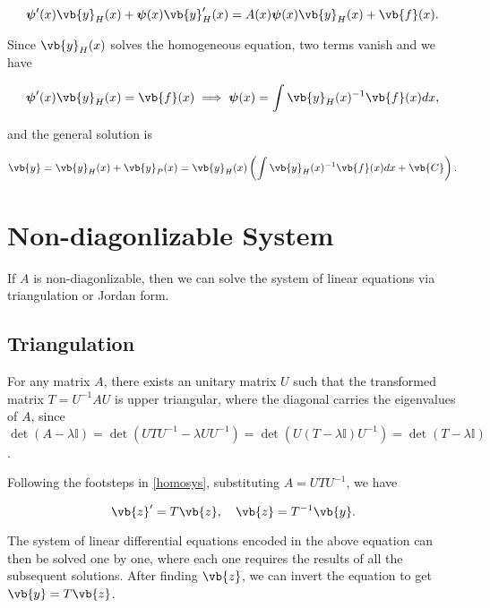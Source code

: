 \documentclass[english,a4paper,12pt]{report}
\begin{document}
\begin{equation}
    \boldsymbol{\psi }'(x)\vb{y} _{H}(x) + \boldsymbol{\psi }(x) \vb{y} _{H}'(x) = A(x) \boldsymbol{\psi }(x) \vb{y} _{H}(x) + \vb{f} (x).
\end{equation}

Since \(\vb{y} _{H}(x)  \) solves the homogeneous equation, two terms vanish and we have

\begin{equation}
    \boldsymbol{\psi }'(x)\vb{y} _{H}(x) = \vb{f} (x) \implies  \boldsymbol{\psi }(x) = \int \vb{y} _{H} (x)^{-1} \vb{f} (x) dx,
\end{equation}

and the general solution is 

\begin{equation}
    \vb{y} = \vb{y} _{H}(x) + \vb{y} _{P}(x) = \vb{y} _{H}(x) \left( \int \vb{y} _{H} (x)^{-1} \vb{f} (x) dx + \vb{C}  \right).
\end{equation}

\section{Non-diagonlizable System}

If \(A\) is non-diagonlizable, then we can solve the system of linear equations via triangulation or Jordan form.

\subsection{Triangulation}

For any matrix \(A\), there exists an unitary matrix \(U\) such that the transformed matrix \(T = U^{-1} AU\) is upper triangular, where the diagonal carries the eigenvalues of \(A\), since \(\det (A-\lambda \mathbb{I}) = \det (UTU^{-1} - \lambda U U^{-1}  ) = \det (U(T-\lambda \mathbb{I})U^{-1} ) = \det (T-\lambda \mathbb{I})\).  

Following the footsteps in \cref{homosys}, substituting \(A = UTU^{-1} \), we have

\begin{equation}
    \vb{z} ' = T\vb{z}, \quad \vb{z} = T^{-1} \vb{y}.
\end{equation}

The system of linear differential equations encoded in the above equation can then be solved one by one, where each one requires the results of all the subsequent solutions. After finding \(\vb{z}\), we can invert the equation to get \(\vb{y}  = T\vb{z} \).
\end{document}

